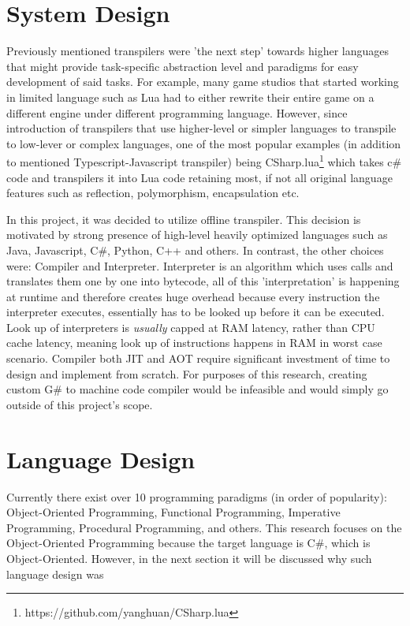 \documentclass{article}
\begin{document}
\section{System Design}
Previously mentioned transpilers were 'the next step' towards higher languages that might provide task-specific abstraction level and paradigms for easy development of said tasks.\cite{gribova_2013_ontology} For example, many game studios that started working in limited language such as Lua had to either rewrite their entire game on a different engine under different programming language. However, since introduction of transpilers that use higher-level or simpler languages to transpile to low-lever or complex languages, one of the most popular examples (in addition to mentioned Typescript-Javascript transpiler) being CSharp.lua\footnote{https://github.com/yanghuan/CSharp.lua} which takes c\# code and transpilers it into Lua code retaining most, if not all original language features such as reflection, polymorphism, encapsulation etc.

In this project, it was decided to utilize offline transpiler. This decision is motivated by strong presence of high-level heavily optimized languages such as Java, Javascript, C\#, Python, C++ and others. In contrast, the other choices were: Compiler and Interpreter.
Interpreter is an algorithm which uses calls and translates them one by one into bytecode, all of this 'interpretation' is happening at runtime and therefore creates huge overhead because every instruction the interpreter executes, essentially has to be looked up before it can be executed. Look up of interpreters is \textit{usually} capped at RAM latency, rather than CPU cache latency, meaning look up of instructions happens in RAM in worst case scenario.
Compiler both JIT and AOT require significant investment of time to design and implement from scratch. For purposes of this research, creating custom G\# to machine code compiler would be infeasible and would simply go outside of this project's scope.








\section{Language Design}
\label{sec:landes}
Currently there exist over 10 programming paradigms (in order of popularity): Object-Oriented Programming, Functional Programming, Imperative Programming, Procedural Programming, and others.
This research focuses on the Object-Oriented Programming because the target language is C\#, which is Object-Oriented. However, in the next section it will be discussed why such language design was
\end{document}
